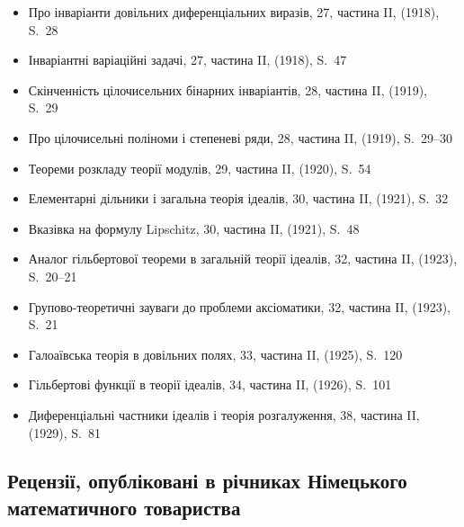 \documentclass[11pt]{article}
\begin{document}
\begin{itemize}[leftmargin=1.5em,itemsep=0.2em]
\item Про інваріанти довільних диференціальних виразів, 27, частина II, (1918), S.~28
\item Інваріантні варіаційні задачі, 27, частина II, (1918), S.~47
\item Скінченність цілочисельних бінарних інваріантів, 28, частина II, (1919), S.~29
\item Про цілочисельні поліноми і степеневі ряди, 28, частина II, (1919), S.~29--30
\item Теореми розкладу теорії модулів, 29, частина II, (1920), S.~54
\item Елементарні дільники і загальна теорія ідеалів, 30, частина II, (1921), S.~32
\item Вказівка на формулу Lipschitz, 30, частина II, (1921), S.~48
\item Аналог гільбертової теореми в загальній теорії ідеалів, 32, частина II, (1923), S.~20--21
\item Групово-теоретичні зауваги до проблеми аксіоматики, 32, частина II, (1923), S.~21
\item Галоаївська теорія в довільних полях, 33, частина II, (1925), S.~120
\item Гільбертові функції в теорії ідеалів, 34, частина II, (1926), S.~101
\item Диференціальні частники ідеалів і теорія розгалуження, 38, частина II, (1929), S.~81
\end{itemize}

\subsection*{Рецензії, опубліковані в річниках Німецького математичного товариства}
\end{document}
